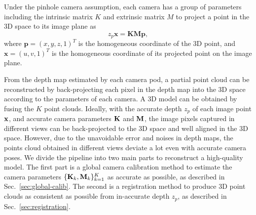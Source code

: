 %
Under the pinhole camera assumption, each camera has a group of parameters including the intrinsic matrix $K$ and extrinsic matrix $M$ to project a point in the 3D space to its image plane as
\begin{equation}\label{eq:cam-proj}
z_{p}\mathbf{x}=\mathbf{K}\mathbf{M}\mathbf{p},
\end{equation}
where $\mathbf{p}=(x,y,z,1)^{T}$ is the homogeneous coordinate of the 3D point, and $\mathbf{x}=(u,v,1)^{T}$ is the homogeneous coordinate of its projected point on the image plane.
%


From the depth map estimated by each camera pod, a partial point cloud can be reconstructed by back-projecting each pixel in the depth map into the 3D space according to the parameters of each camera.
%
A 3D model can be obtained by fusing the $K$ point clouds.
%
%
Ideally, with the accurate depth $z_p$ of each image point $\mathbf{x}$, and accurate camera parameters $\mathbf{K}$ and $\mathbf{M}$, the image pixels captured in different views can be back-projected to the 3D space and well aligned in the 3D space.
%
However, due to the unavoidable error and noises in depth maps, the points cloud obtained in different views deviate a lot even with accurate camera poses.
We divide the pipeline into two main parts to reconstruct a high-quality model.
%
The first part is a global camera calibration method to estimate the camera parameters $\{\mathbf{K}_k, \mathbf{M}_k\}^{K}_{k=1}$ as accurate as possible, as described in Sec.~\ref{sec:global-calib}.
The second is a registration method to produce 3D point clouds as consistent as possible from in-accurate depth $z_p$, as described in Sec.~\ref{sec:registration}.



